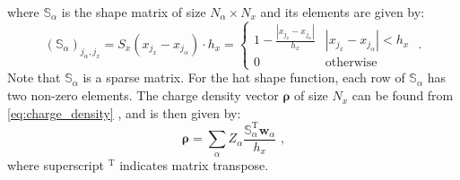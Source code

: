 \documentclass[12pt]{article}
\let\orgautoref\autoref
\renewcommand{\autoref}[1]
{%
    \def\equationautorefname{Eq.}%
    \def\figureautorefname{Fig.}%
    \def\subfigureautorefname{Fig.}%
    \def\sectionautorefname{Sec.}%
    \def\subsubsectionautorefname{Sec.}%
    \orgautoref{#1}%
}
\begin{document}
where $\mathbb{S}_\alpha$ is the shape matrix of size $N_\alpha \times N_x$ and its elements are given by:
\begin{equation}
	(\mathbb{S}_\alpha)_{j_\alpha, j_x} = S_x(x_{j_x} - x_{j_\alpha}) \cdot h_x = \left\{ \begin{array}{ll}
		1 - \frac{|x_{j_x} - x_{j_\alpha}|}{h_x} & |x_{j_x} - x_{j_\alpha}| < h_x \\
		0 & \textrm{otherwise}
	\end{array} \right. \textrm{ .}
\end{equation}
Note that $\mathbb{S}_\alpha$ is a sparse matrix.
For the hat shape function, each row of $\mathbb{S}_\alpha$ has two non-zero elements.
The charge density vector $\boldsymbol{\rho}$ of size $N_x$ can be found from \autoref{eq:charge_density}, and is then given by:
\begin{equation}
	\boldsymbol{\rho} = \sum_\alpha Z_\alpha \frac{\mathbb{S}_\alpha^{\mathrm{T}} \boldsymbol{w}_\alpha}{h_x} \textrm{ ,}
\end{equation}
where superscript $^\mathrm{T}$ indicates matrix transpose.
\end{document}
